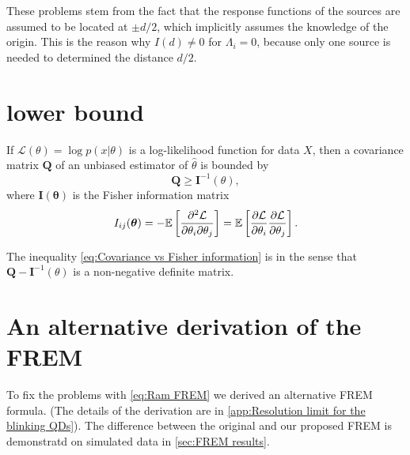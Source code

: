 These problems stem from the fact that the response functions of the sources are assumed to be located at $\pm d/2$, which implicitly assumes the knowledge of the origin. This is the reason why $I(d)\neq0$ for $\Lambda_i=0$, because only one source is needed to determined the distance $d/2$. 


\section{\CR lower bound}

If $\mathcal{L}(\theta)=\log p(x|\theta)$ is a log-likelihood function for data $X$, then a covariance matrix $\bm{Q}$ of an unbiased estimator of $\hat{\theta}$ is bounded by \cite{Rao1945,Cover1991} 
%
\begin{equation}
	\bm{Q}\geq\bm{I}^{-1}(\theta),
	\label{eq:Covariance vs Fisher information}
\end{equation}
%
where $\bm{I}(\bm{\theta})$ is the Fisher information matrix 
%
\begin{equation}
	I_{ij}(\bm{\theta})=-\mathbb{E}\left[\frac{\partial^2\mathcal{L}}{\partial\theta_i\partial\theta_j}\right]=\mathbb{E}\left[\frac{\partial\mathcal{L}}{\partial\theta_i}\frac{\partial\mathcal{L}}{\partial\theta_j}\right].
	\label{eq:Fisher information general}
\end{equation}

The inequality \autoref{eq:Covariance vs Fisher information} is in the sense that $\bm{Q}-\bm{I}^{-1}(\theta)$ is a non-negative definite matrix.



\section{An alternative derivation of the FREM\label{sub:An-alternative-derivation-FREM}} 

To fix the problems with \autoref{eq:Ram FREM} we derived an alternative FREM formula. (The details of the derivation are in \autoref{app:Resolution limit for the blinking QDs}). The difference between the original and our proposed FREM is demonstratd on simulated data in \autoref{sec:FREM results}.

